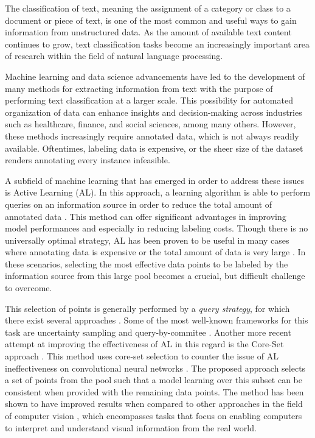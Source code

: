 \documentclass[english,bachelor,ul]{webisthesis} %
\begin{document}
The classification of text, meaning the assignment of a category or class to a document or piece of text, is one of the most common and useful ways to gain information from unstructured data. As the amount of available text content continues to grow, text classification tasks become an increasingly important area of research within the field of natural language processing. 

Machine learning and data science advancements have led to the development of many methods for extracting information from text with the purpose of performing text classification at a larger scale. This possibility for automated organization of data can enhance insights and decision-making across industries such as healthcare, finance, and social sciences, among many others. However, these methods increasingly require annotated data, which is not always readily available. Oftentimes, labeling data is expensive, or the sheer size of the dataset renders annotating every instance infeasible.

A subfield of machine learning that has emerged in order to address these issues is Active Learning (AL). In this approach, a learning algorithm is able to perform queries on an information source in order to reduce the total amount of annotated data \citep{settles.tr09}. This method can offer significant advantages in improving model performances and especially in reducing labeling costs. Though there is no universally optimal strategy, AL has been proven to be useful in many cases where annotating data is expensive or the total amount of data is very large \citep{settles.tr09}. In these scenarios, selecting the most effective data points to be labeled by the information source from this large pool becomes a crucial, but difficult challenge to overcome. 

This selection of points is generally performed by a \textit{query strategy}, for which there exist several approaches \citep{settles.tr09}. Some of the most well-known frameworks for this task are uncertainty sampling \citep{DBLP:conf/sigir/LewisG94} and query-by-commitee \citep{DBLP:conf/colt/SeungOS92}. Another more recent attempt at improving the effectiveness of AL in this regard is the Core-Set approach \citep{DBLP:conf/iclr/SenerS18}. This method uses core-set selection to counter the issue of AL ineffectiveness on convolutional neural networks \citep{DBLP:conf/iclr/SenerS18}. The proposed approach selects a set of points from the pool such that a model learning over this subset can be consistent when provided with the remaining data points. The method has been shown to have improved results when compared to other approaches in the field of computer vision \citep{DBLP:conf/iclr/SenerS18, DBLP:conf/cvpr/CaramalauBK21}, which encompasses tasks that focus on enabling computers to interpret and understand visual information from the real world. 
\end{document}
